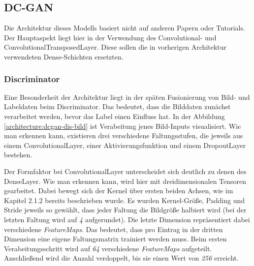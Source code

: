 \subsection{DC-GAN}
\label{section:dc-gan-late-label}
Die Architektur dieses Modells basiert nicht auf anderen Papern oder Tutorials.
Der Hauptaspekt liegt hier in der Verwendung des Convolutional- und ConvolutionalTransposedLayer.
Diese sollen die in vorherigen Architektur verwendeten Dense-Schichten ersetzten.

\subsubsection{Discriminator}
Eine Besonderheit der Architektur liegt in der späten Fusionierung von Bild- und Labeldaten beim Discriminator.
Das bedeutet, dass die Bilddaten zunächst verarbeitet werden, bevor das Label einen Einfluss hat.
In der Abbildung \ref{architecture:dcgan-dis-bild} ist Verabeitung jenes Bild-Inputs visualisiert.
Wie man erkennen kann, existieren drei verschiedene Faltungsstufen, die jeweils aus einem ConvolutionalLayer, einer Aktivierungsfunktion und einem DropoutLayer bestehen.
\newline

Der Formfaktor bei ConvolutionalLayer unterscheidet sich deutlich zu denen des DenseLayer.
Wie man erkennen kann, wird hier mit dreidimensionalen Tensoren gearbeitet.
Dabei bewegt sich der Kernel über ersten beiden Achsen, wie im Kapitel 2.1.2 bereits beschrieben wurde.
Es wurden Kernel-Größe, Padding und Stride jeweils so gewählt, dass jeder Faltung die Bildgröße halbiert wird (bei der letzten Faltung wird auf \textit{4} aufgerundet).
Die letzte Dimension repräsentiert dabei verschiedene \textit{FeatureMaps}.
Das bedeutet, dass pro Eintrag in der dritten Dimension eine eigene Faltungsmatrix trainiert werden muss.
Beim ersten Verabeitungsschritt wird auf \textit{64} verschiedene \textit{FeatureMaps} aufgeteilt.
Anschließend wird die Anzahl verdoppelt, bis sie einen Wert von \textit{256} erreicht.

